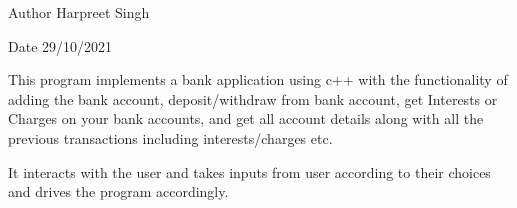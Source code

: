 \begin{DoxyAuthor}{Author}
Harpreet Singh 
\end{DoxyAuthor}
\begin{DoxyDate}{Date}
29/10/2021
\end{DoxyDate}
This program implements a bank application using c++ with the functionality of adding the bank account, deposit/withdraw from bank account, get Interests or Charges on your bank accounts, and get all account details along with all the previous transactions including interests/charges etc.

It interacts with the user and takes inputs from user according to their choices and drives the program accordingly. 